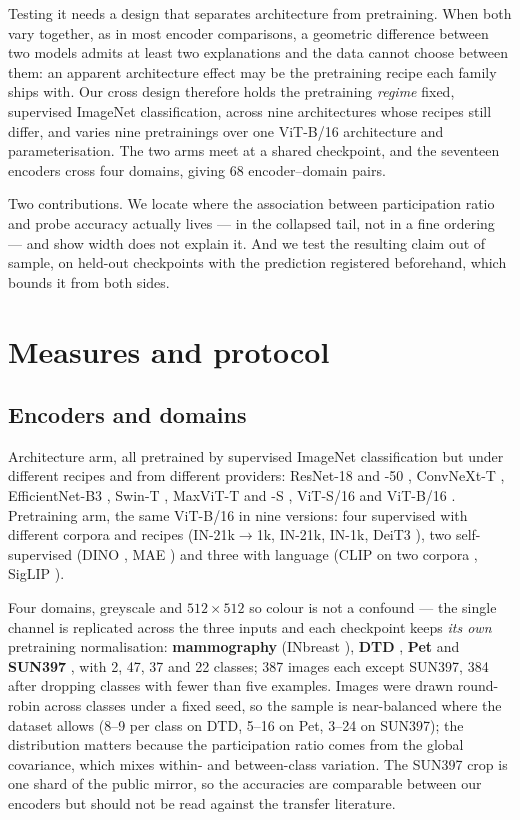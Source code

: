 \documentclass{esannV2}
\begin{document}
Testing it needs a design that separates architecture from pretraining. When
both vary together, as in most encoder comparisons, a geometric difference
between two models admits at least two explanations and the data cannot choose
between them: an apparent architecture effect may be the pretraining recipe
each family ships with. Our cross design therefore holds the pretraining
\emph{regime} fixed, supervised ImageNet classification, across nine
architectures whose recipes still differ, and varies nine pretrainings over one
ViT-B/16 architecture and parameterisation. The two arms meet at a shared
checkpoint, and the seventeen encoders cross four domains, giving 68
encoder--domain pairs.

Two contributions. We locate where the association between participation ratio
and probe accuracy actually lives --- in the collapsed tail, not in a fine
ordering --- and show width does not explain it. And we test the resulting
claim out of sample, on held-out checkpoints with the prediction registered
beforehand, which bounds it from both sides.

\section{Measures and protocol}

\subsection{Encoders and domains}

Architecture arm, all pretrained by supervised ImageNet classification but
under different recipes and from different providers: ResNet-18 and -50
\cite{ResNet}, ConvNeXt-T
\cite{ConvNeXt}, EfficientNet-B3 \cite{EffNet}, Swin-T \cite{Swin}, MaxViT-T
and -S \cite{MaxViT}, ViT-S/16 and ViT-B/16 \cite{ViT}. Pretraining arm, the
same ViT-B/16 in nine versions: four supervised with different corpora and
recipes (IN-21k$\to$1k, IN-21k, IN-1k, DeiT3 \cite{DeiT3}), two
self-supervised (DINO \cite{DINO}, MAE \cite{MAE}) and three with language
(CLIP on two corpora \cite{CLIP}, SigLIP \cite{SigLIP}).

Four domains, greyscale and $512\times512$ so colour is not a confound --- the
single channel is replicated across the three inputs and each checkpoint keeps
\emph{its own} pretraining normalisation: \textbf{mammography} (INbreast
\cite{INbreast}), \textbf{DTD} \cite{DTD}, \textbf{Pet} \cite{Pet} and
\textbf{SUN397} \cite{SUN397}, with 2, 47, 37 and 22 classes; 387 images each
except SUN397, 384 after dropping classes with fewer than five examples. Images
were drawn round-robin across classes under a fixed seed, so the sample is
near-balanced where the dataset allows (8--9 per class on DTD, 5--16 on Pet,
3--24 on SUN397); the distribution matters because the participation ratio
comes from the global covariance, which mixes within- and between-class
variation. The SUN397 crop is one shard of the public mirror, so the accuracies
are comparable between our encoders but should not be read against the transfer
literature.
\end{document}
